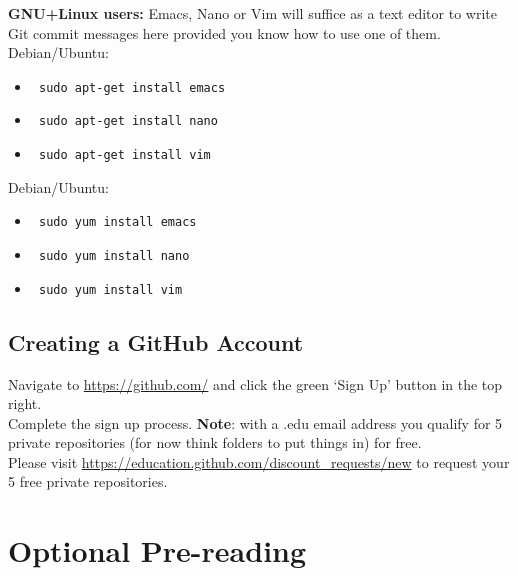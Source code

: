 \documentclass{article}[12pt]
\begin{document}
\textbf{GNU+Linux users:} Emacs, Nano or Vim will suffice as a text editor to write Git commit messages here provided you know how to use one of them.
Debian/Ubuntu: \begin{itemize}
\item \begin{verbatim} sudo apt-get install emacs \end{verbatim} 
\item \begin{verbatim} sudo apt-get install nano \end{verbatim} 
\item \begin{verbatim} sudo apt-get install vim \end{verbatim} 
\end{itemize}

Debian/Ubuntu: \begin{itemize}
\item \begin{verbatim} sudo yum install emacs \end{verbatim} 
\item \begin{verbatim} sudo yum install nano \end{verbatim} 
\item \begin{verbatim} sudo yum install vim \end{verbatim} 
\end{itemize}

\subsection*{Creating a GitHub Account}
Navigate to \url{https://github.com/} and click the green `Sign Up' button in the top right.\\
Complete the sign up process.
\newline
\newline
\textbf{Note}: with a .edu email address you qualify for 5 private repositories (for now think folders to put things in) for free.\\
Please visit \url{https://education.github.com/discount_requests/new} to request your 5 free private repositories.

\section*{Optional Pre-reading}
\end{document}
